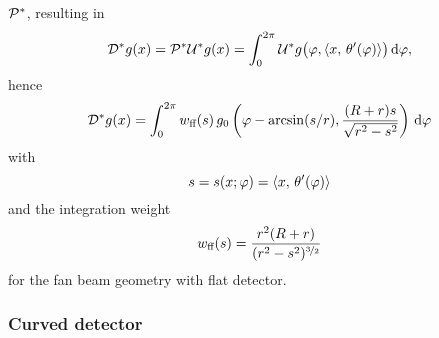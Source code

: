 \documentclass{amsart}
\renewcommand*{\phi}{\varphi}
\begin{document}
${\mathcal{P}}^*$, resulting in
%
\begin{equation*}
 \OPD^*g(x) = \OPP^*\OPU^*g(x) = \int_0^{2\pi} \OPU^*g\big(\phi, \INNER{x}{\theta'(\phi)}\big)\, \D\phi,
\end{equation*}
%
hence
%
\begin{equation}
 \label{eq:fanflat:backproj}
 \OPD^*g(x) = \int_0^{2\pi} w_{\text{ff}}(s)\, g_0\left( \phi - \arcsin(s/r), \frac{(R+r)s}{\sqrt{r^2-s^2}} \right)\, \D\phi
\end{equation} 
%
with
%
\begin{equation}
 \label{eq:fanflat:backproj_s}
 s = s(x; \phi) = \INNER{x}{\theta'(\phi)}
\end{equation}
%
and the integration weight
%
\begin{equation}
 \label{eq:fanflat:backproj_weight}
 w_{\text{ff}}(s) = \frac{r^2(R+r)}{(r^2-s^2)^{\nicefrac{3}{2}}}
\end{equation}
%
for the fan beam geometry with flat detector.
%
\vspace{5ex}

\subsubsection{Curved detector}
\label{sec:applications:fanbeam:curved}
\end{document}

